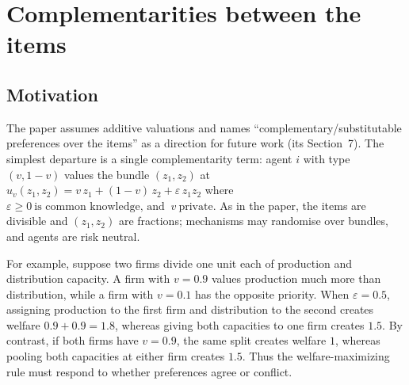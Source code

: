 
\section{Complementarities between the items}
\label{sec:eps}

\subsection{Motivation}

The paper assumes additive valuations and names ``complementary/substitutable preferences over
the items'' as a direction for future work (its Section~7). The simplest departure is a single
complementarity term: agent $i$ with type $(v,1-v)$ values the bundle $(z_1,z_2)$ at $u_v(z_1,z_2)=v\,z_1+(1-v)\,z_2+\varepsilon\,z_1z_2$ where $\varepsilon\ge0\ \text{is common knowledge, and }\ v\ \text{private}.$
As in the paper, the items are divisible and $(z_1,z_2)$ are fractions; mechanisms may
randomise over bundles, and agents are risk neutral.

For example, suppose two firms divide one unit each of production and distribution
capacity. A firm with $v=0.9$ values production much more than distribution, while a
firm with $v=0.1$ has the opposite priority. When $\varepsilon=0.5$, assigning
production to the first firm and distribution to the second creates welfare
$0.9+0.9=1.8$, whereas giving both capacities to one firm creates $1.5$.
By contrast, if both firms have $v=0.9$, the same split creates welfare $1$,
whereas pooling both capacities at either firm creates $1.5$.
Thus the welfare-maximizing rule must respond to whether preferences agree or
conflict.



